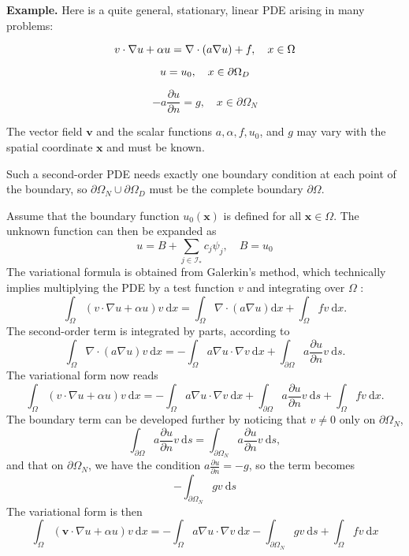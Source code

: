 \documentclass[../main.tex]{subfiles}
\begin{document}
	\textbf{Example.   } Here is a quite general, stationary, linear PDE arising in many problems:
	
	\begin{equation}
		\label{eqa198}
		v \cdot \nabla u+\alpha u=\nabla \cdot(a \nabla u)+f, \quad x \in \Omega \\
	\end{equation}

	\begin{equation}
		\label{eqa199}
		u=u_{0}, \quad x \in \partial \Omega_{D} \\
	\end{equation}

	\begin{equation}
		\label{eqa200}
		-a \frac{\partial u}{\partial n}=g, \quad x \in \partial \Omega_{N}
	\end{equation}
	
	\noindent The vector field $\boldsymbol{v}$ and the scalar functions $a, \alpha, f, u_{0}$, and $g$ may vary with the spatial coordinate $\boldsymbol{x}$ and must be known.
	
	Such a second-order PDE needs exactly one boundary condition at each point of the boundary, so $\partial \Omega_{N} \cup \partial \Omega_{D}$ must be the complete boundary $\partial \Omega$.
	
	Assume that the boundary function $u_{0}(\boldsymbol{x})$ is defined for all $\boldsymbol{x} \in \Omega$. The unknown function can then be expanded as
	$$
	u=B+\sum_{j \in \mathcal{I}_{*}} c_{j} \psi_{j}, \quad B=u_{0}
	$$
	The variational formula is obtained from Galerkin's method, which technically implies multiplying the PDE by a test function $v$ and integrating over $\Omega$ :
	$$
	\int_{\Omega}(v \cdot \nabla u+\alpha u) v \mathrm{~d} x=\int_{\Omega} \nabla \cdot(a \nabla u) \mathrm{d} x+\int_{\Omega} f v \mathrm{~d} x .
	$$
	The second-order term is integrated by parts, according to
	$$
	\int_{\Omega} \nabla \cdot(a \nabla u) v \mathrm{~d} x=-\int_{\Omega} a \nabla u \cdot \nabla v \mathrm{~d} x+\int_{\partial \Omega} a \frac{\partial u}{\partial n} v \mathrm{~d} s .
	$$
	The variational form now reads
	$$
	\int_{\Omega}(v \cdot \nabla u+\alpha u) v \mathrm{~d} x=-\int_{\Omega} a \nabla u \cdot \nabla v \mathrm{~d} x+\int_{\partial \Omega} a \frac{\partial u}{\partial n} v \mathrm{~d} s+\int_{\Omega} f v \mathrm{~d} x .
	$$
	The boundary term can be developed further by noticing that $v \neq 0$ only on $\partial \Omega_{N}$,
	$$
	\int_{\partial \Omega} a \frac{\partial u}{\partial n} v \mathrm{~d} s=\int_{\partial \Omega_{N}} a \frac{\partial u}{\partial n} v \mathrm{~d} s,
	$$
	and that on $\partial \Omega_{N}$, we have the condition $a \frac{\partial u}{\partial n}=-g$, so the term becomes
	$$
	-\int_{\partial \Omega_{N}} g v \mathrm{~d} s
	$$
	The variational form is then
	$$
	\int_{\Omega}(\boldsymbol{v} \cdot \nabla u+\alpha u) v \mathrm{~d} x=-\int_{\Omega} a \nabla u \cdot \nabla v \mathrm{~d} x-\int_{\partial \Omega_{N}} g v \mathrm{~d} s+\int_{\Omega} f v \mathrm{~d} x
	$$
	
\end{document}
